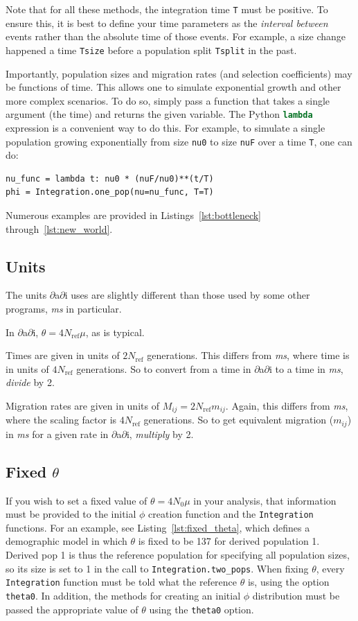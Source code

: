 \documentclass[12pt]{article}
\makeatletter
\newcommand{\dadi}{$\partial$a$\partial$i\xspace}
\newcommand{\Nref}{\ensuremath{N_\text{ref}}\xspace}
\newcommand{\ms}{\emph{ms}\xspace}
\newcommand{\py}[1]{\lstinline[language=Python, showstringspaces=False]@#1@}
\makeatother
\begin{document}
Note that for all these methods, the integration time \py{T} must be positive.
To ensure this, it is best to define your time parameters as the \emph{interval between} events rather than the absolute time of those events.
For example, a size change happened a time \py{Tsize} before a population split \py{Tsplit} in the past.

Importantly, population sizes and migration rates (and selection coefficients) may be functions of time.
This allows one to simulate exponential growth and other more complex scenarios.
To do so, simply pass a function that takes a single argument (the time) and returns the given variable.
The Python \py{lambda} expression is a convenient way to do this.
For example, to simulate a single population growing exponentially from size \py{nu0} to size \py{nuF} over a time \py{T}, one can do:
\begin{lstlisting}
nu_func = lambda t: nu0 * (nuF/nu0)**(t/T)
phi = Integration.one_pop(nu=nu_func, T=T)
\end{lstlisting}

Numerous examples are provided in Listings~\ref{lst:bottleneck} through~\ref{lst:new_world}.

\subsection{Units}
The units \dadi uses are slightly different than those used by some other programs, \ms in particular.

In \dadi, $\theta = 4 \Nref \mu$, as is typical.

Times are given in units of $2 \Nref$ generations.
This differs from \emph{ms}, where time is in units of $4 \Nref$ generations.
So to convert from a time in \dadi to a time in \emph{ms}, \emph{divide} by 2.

Migration rates are given in units of $M_{ij} = 2 \Nref m_{ij}$.
Again, this differs from \emph{ms}, where the scaling factor is $4 \Nref$ generations.
So to get equivalent migration ($m_{ij}$) in \ms for a given rate in \dadi, \emph{multiply} by 2.


\subsection{Fixed $\theta$}\label{sec:fixed_theta}

If you wish to set a fixed value of $\theta = 4 N_0 \mu$ in your analysis, that information must be provided to the initial $\phi$ creation function and the \py{Integration} functions.
For an example, see Listing~\ref{lst:fixed_theta}, which defines a demographic model in which $\theta$ is fixed to be 137 for derived population 1.
Derived pop 1 is thus the reference population for specifying all population sizes, so its size is set to 1 in the call to \py{Integration.two_pops}.
When fixing $\theta$, every \py{Integration} function must be told what the reference $\theta$ is, using the option \py{theta0}.
In addition, the methods for creating an initial $\phi$ distribution must be passed the appropriate value of $\theta$ using the \py{theta0} option.
\end{document}
